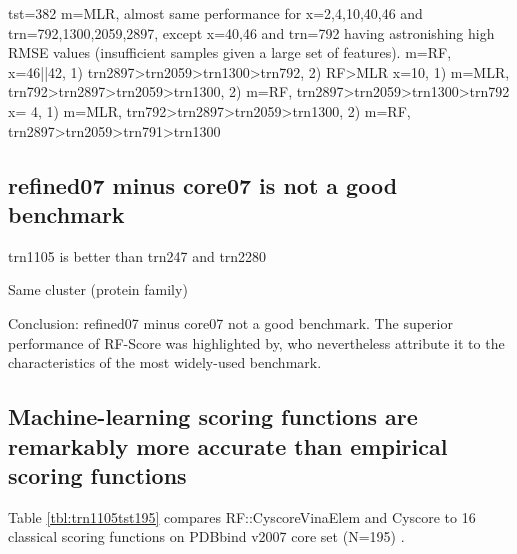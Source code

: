 \documentclass[10pt,conference,compsocconf]{IEEEtran}
\begin{document}
tst=382
m=MLR, almost same performance for x=2,4,10,40,46 and trn=792,1300,2059,2897, except x=40,46 and trn=792 having astronishing high RMSE values (insufficient samples given a large set of features).
m=RF, 
x=46||42, 1) trn2897>trn2059>trn1300>trn792, 2) RF>MLR
x=10, 1) m=MLR, trn792>trn2897>trn2059>trn1300, 2) m=RF, trn2897>trn2059>trn1300>trn792
x= 4, 1) m=MLR, trn792>trn2897>trn2059>trn1300, 2) m=RF, trn2897>trn2059>trn791>trn1300

\subsection{refined07 minus core07 is not a good benchmark}

trn1105 is better than trn247 and trn2280

Same cluster (protein family)

Conclusion: refined07 minus core07 not a good benchmark.
The superior performance of RF-Score was highlighted by, who nevertheless attribute it to the characteristics of the most widely-used benchmark. \cite{774}

\subsection{Machine-learning scoring functions are remarkably more accurate than empirical scoring functions}

Table \ref{tbl:trn1105tst195} compares RF::CyscoreVinaElem and Cyscore to 16 classical scoring functions on PDBbind v2007 core set (N=195) \cite{1313}.
\end{document}

